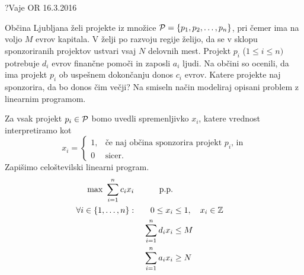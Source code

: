 
\begin{naloga}{?}{Vaje OR 16.3.2016}
\begin{vprasanje}[proj]
Občina Ljubljana želi projekte iz množice
$\mathcal{P} = \{p_1, p_2, \dots, p_n\}$,
pri čemer ima na voljo $M$ evrov kapitala.
V želji po razvoju regije želijo,
da se v sklopu sponzoriranih projektov ustvari vsaj $N$ delovnih mest.
Projekt $p_i$ ($1 \le i \le n)$ potrebuje $d_i$ evrov finančne pomoči
in zaposli $a_i$ ljudi.
Na občini so ocenili,
da ima projekt $p_i$ ob uspešnem dokončanju donos $c_i$ evrov.
Katere projekte naj sponzorira, da bo donos čim večji?
Na smiseln način modeliraj opisani problem z linearnim programom.
\end{vprasanje}

\begin{odgovor}
Za vsak projekt $p_i \in \mathcal{P}$ bomo uvedli spremenljivko $x_i$,
katere vrednost interpretiramo kot
$$
x_i = \begin{cases}
1, & \text{če naj občina sponzorira projekt $p_i$, in} \\
0  & \text{sicer.}
\end{cases}
$$
Zapišimo celoštevilski linearni program.
\begin{alignat*}{2}
\max \ \sum_{i=1}^n c_i x_i && \text{p.p.} \\
\forall i \in \{1, \dots, n\}: &\ & 0 \le x_i &\le 1, \quad x_i \in \mathbb{Z} \\
&& \sum_{i=1}^n d_i x_i &\le M \\
&& \sum_{i=1}^n a_i x_i &\ge N
\end{alignat*}
\end{odgovor}
\end{naloga}


